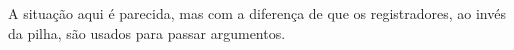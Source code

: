 
A situação aqui é parecida, mas com a diferença de que os registradores, ao invés da pilha, são usados para passar argumentos.






